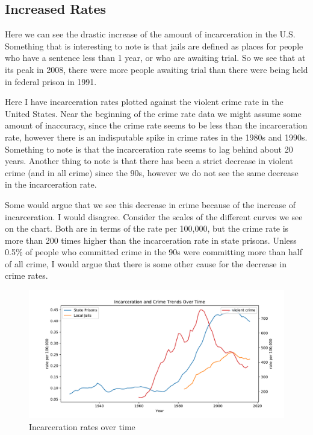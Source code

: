 \documentclass[11pt]{article}
\begin{document}
\hypertarget{increased-rates}{%
\subsection{Increased Rates}\label{increased-rates}}

Here we can see the drastic increase of the amount of incarceration in
the U.S. Something that is interesting to note is that jails are defined
as places for people who have a sentence less than 1 year, or who are
awaiting trial. So we see that at its peak in 2008, there were more
people awaiting trial than there were being held in federal prison in
1991.

Here I have incarceration rates plotted against the violent crime rate
in the United States. Near the beginning of the crime rate data we might
assume some amount of inaccuracy, since the crime rate seems to be less
than the incarceration rate, however there is an indisputable spike in
crime rates in the 1980s and 1990s. Something to note is that the
incarceration rate seems to lag behind about 20 years. Another thing to
note is that there has been a strict decrease in violent crime (and in
all crime) since the 90s, however we do not see the same decrease in the
incarceration rate.

Some would argue that we see this decrease in crime because of the
increase of incarceration. I would disagree. Consider the scales of the
different curves we see on the chart. Both are in terms of the rate per
100,000, but the crime rate is more than 200 times higher than the
incarceration rate in state prisons. Unless 0.5\% of people who
committed crime in the 90s were committing more than half of all crime,
I would argue that there is some other cause for the decrease in crime
rates.

\begin{figure}[H]
    \centering
    \includegraphics[width=\textwidth]{images/incar_trends.pdf}
    \caption{Incarceration rates over time}
    \label{fig:my_label}
\end{figure}
    
\end{document}
